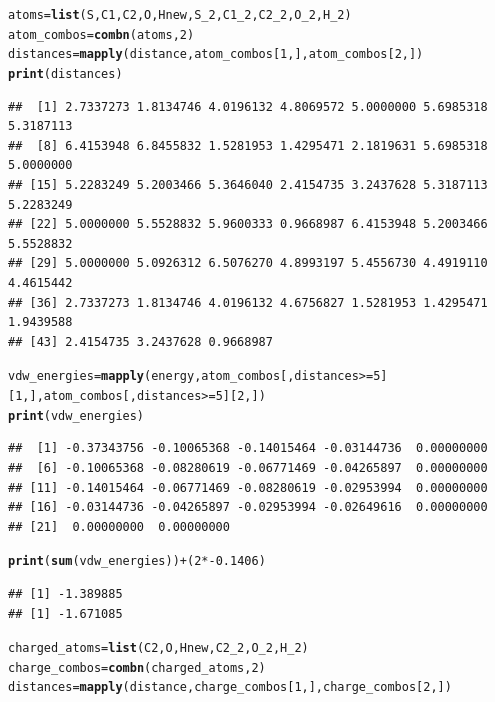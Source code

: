 \documentclass{article}\usepackage[]{graphicx}\usepackage[]{color}
\makeatletter
\newcommand{\hlnum}[1]{\textcolor[rgb]{0.686,0.059,0.569}{#1}}%
\newcommand{\hlopt}[1]{\textcolor[rgb]{0,0,0}{#1}}%
\newcommand{\hlstd}[1]{\textcolor[rgb]{0.345,0.345,0.345}{#1}}%
\newcommand{\hlkwb}[1]{\textcolor[rgb]{0.69,0.353,0.396}{#1}}%
\newcommand{\hlkwd}[1]{\textcolor[rgb]{0.737,0.353,0.396}{\textbf{#1}}}%
\newenvironment{kframe}{%
 \def\at@end@of@kframe{}%
 \ifinner\ifhmode%
  \def\at@end@of@kframe{\end{minipage}}%
  \begin{minipage}{\columnwidth}%
 \fi\fi%
 \def\FrameCommand##1{\hskip\@totalleftmargin \hskip-\fboxsep
 \colorbox{shadecolor}{##1}\hskip-\fboxsep
     \hskip-\linewidth \hskip-\@totalleftmargin \hskip\columnwidth}%
 \MakeFramed {\advance\hsize-\width
   \@totalleftmargin\z@ \linewidth\hsize
   \@setminipage}}%
 {\par\unskip\endMakeFramed%
 \at@end@of@kframe}
\newenvironment{knitrout}{}{} %
\makeatother
\begin{document}
\begin{knitrout}
\color{fgcolor}\begin{kframe}
\begin{alltt}
  \hlstd{atoms} \hlkwb{=} \hlkwd{list}\hlstd{(S,C1,C2,O,Hnew,S_2,C1_2,C2_2,O_2,H_2)}
  \hlstd{atom_combos} \hlkwb{=} \hlkwd{combn}\hlstd{(atoms,}\hlnum{2}\hlstd{)}
  \hlstd{distances}\hlkwb{=}\hlkwd{mapply}\hlstd{(distance,atom_combos[}\hlnum{1}\hlstd{,],atom_combos[}\hlnum{2}\hlstd{,])}
  \hlkwd{print}\hlstd{(distances)}
\end{alltt}
\begin{verbatim}
##  [1] 2.7337273 1.8134746 4.0196132 4.8069572 5.0000000 5.6985318 5.3187113
##  [8] 6.4153948 6.8455832 1.5281953 1.4295471 2.1819631 5.6985318 5.0000000
## [15] 5.2283249 5.2003466 5.3646040 2.4154735 3.2437628 5.3187113 5.2283249
## [22] 5.0000000 5.5528832 5.9600333 0.9668987 6.4153948 5.2003466 5.5528832
## [29] 5.0000000 5.0926312 6.5076270 4.8993197 5.4556730 4.4919110 4.4615442
## [36] 2.7337273 1.8134746 4.0196132 4.6756827 1.5281953 1.4295471 1.9439588
## [43] 2.4154735 3.2437628 0.9668987
\end{verbatim}
\begin{alltt}
  \hlstd{vdw_energies} \hlkwb{=} \hlkwd{mapply}\hlstd{(energy,atom_combos[,distances}\hlopt{>=}\hlnum{5}\hlstd{][}\hlnum{1}\hlstd{,],atom_combos[,distances}\hlopt{>=}\hlnum{5}\hlstd{][}\hlnum{2}\hlstd{,])}
  \hlkwd{print}\hlstd{(vdw_energies)}
\end{alltt}
\begin{verbatim}
##  [1] -0.37343756 -0.10065368 -0.14015464 -0.03144736  0.00000000
##  [6] -0.10065368 -0.08280619 -0.06771469 -0.04265897  0.00000000
## [11] -0.14015464 -0.06771469 -0.08280619 -0.02953994  0.00000000
## [16] -0.03144736 -0.04265897 -0.02953994 -0.02649616  0.00000000
## [21]  0.00000000  0.00000000
\end{verbatim}
\begin{alltt}
  \hlkwd{print}\hlstd{(}\hlkwd{sum}\hlstd{(vdw_energies))}\hlopt{+}\hlstd{(}\hlnum{2}\hlopt{*-}\hlnum{0.1406}\hlstd{)}
\end{alltt}
\begin{verbatim}
## [1] -1.389885
## [1] -1.671085
\end{verbatim}
\begin{alltt}
  \hlstd{charged_atoms} \hlkwb{=} \hlkwd{list}\hlstd{(C2,O,Hnew,C2_2,O_2,H_2)}
  \hlstd{charge_combos} \hlkwb{=} \hlkwd{combn}\hlstd{(charged_atoms,}\hlnum{2}\hlstd{)}
  \hlstd{distances}\hlkwb{=}\hlkwd{mapply}\hlstd{(distance,charge_combos[}\hlnum{1}\hlstd{,],charge_combos[}\hlnum{2}\hlstd{,])}

\end{alltt}
\end{kframe}
\end{knitrout}
\end{document}
